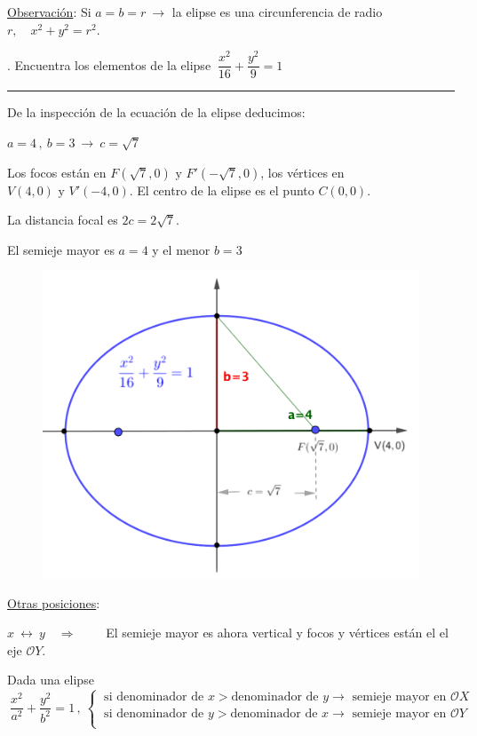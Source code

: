 \begin{cuadro-naranja}
	\underline{Observación}:\hspace{5mm} Si $a=b=r \ \to $ la elipse es una circunferencia de radio $r,\quad x^2+y^2=r^2$.	
\end{cuadro-naranja}


\vspace{4mm}

\begin{miejemplo}
.	Encuentra los elementos de la elipse $\ \dfrac{x^2}{16}+\dfrac{y^2}{9}=1$

\rule{300pt}{0.1pt}  
\vspace{-5mm}
\begin{multicols}{2}
De la inspección de la ecuación de la elipse deducimos:

$a=4\, , \ b=3 \ \to \ c=\sqrt{7}$

Los focos están en $F(\sqrt{7},0) \text{ y }  F'(-\sqrt{7},0)$, los vértices en $V(4,0) \text{ y } V'(-4,0)$. El centro de la elipse es el punto $C(0,0)$.

La distancia focal es $2c=2\sqrt 7$.

El semieje mayor es $a=4$ y el menor $b=3$

\begin{figure}[H]
	\centering
	\includegraphics[width=.4\textwidth]{img-conicas/conicas09.png}
	\end{figure}	
\end{multicols}
\end{miejemplo}

\vspace{4mm} \underline{Otras posiciones}:

$x\ \leftrightarrow \ y \quad \Rightarrow \qquad $ El semieje mayor es ahora vertical y focos  y vértices están el el eje $\mathcal OY$.

\begin{small}Dada una elipse $\  \dfrac{x^2}{a^2}+\dfrac{y^2}{b^2}=1  \, , \ \begin{cases} 
  	\ \text{si denominador de } x > \text{denominador de } y \to \text{ semieje mayor en } \mathcal OX \\ 
  	\ \text{si denominador de } y > \text{denominador de } x \to \text{ semieje mayor en } \mathcal OY \\  
  	\end{cases}$\end{small}
  	

